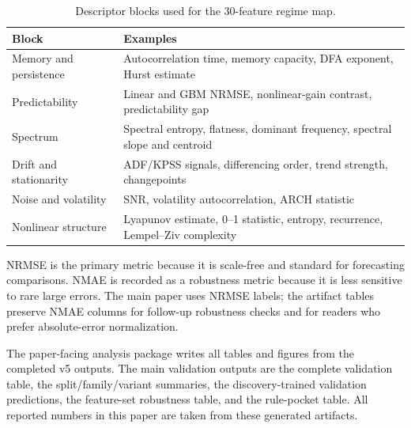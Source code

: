 \begin{table}[!t]
\centering
\caption{Descriptor blocks used for the 30-feature regime map.}
\label{tab:feature-blocks}
\scriptsize
\setlength{\tabcolsep}{3.0pt}
\renewcommand{\arraystretch}{1.05}
\begin{tabularx}{\columnwidth}{@{}lX@{}}
\toprule
Block & Examples \\
\midrule
Memory and persistence & Autocorrelation time, memory capacity, DFA exponent, Hurst estimate \\
Predictability & Linear and GBM NRMSE, nonlinear-gain contrast, predictability gap \\
Spectrum & Spectral entropy, flatness, dominant frequency, spectral slope and centroid \\
Drift and stationarity & ADF/KPSS signals, differencing order, trend strength, changepoints \\
Noise and volatility & SNR, volatility autocorrelation, ARCH statistic \\
Nonlinear structure & Lyapunov estimate, 0--1 statistic, entropy, recurrence, Lempel--Ziv complexity \\
\bottomrule
\end{tabularx}
\end{table}

NRMSE is the primary metric because it is scale-free and standard for forecasting comparisons. NMAE is recorded as a robustness metric because it is less sensitive to rare large errors. The main paper uses NRMSE labels; the artifact tables preserve NMAE columns for follow-up robustness checks and for readers who prefer absolute-error normalization.

The paper-facing analysis package writes all tables and figures from the completed v5 outputs. The main validation outputs are the complete validation table, the split/family/variant summaries, the discovery-trained validation predictions, the feature-set robustness table, and the rule-pocket table. All reported numbers in this paper are taken from these generated artifacts.
